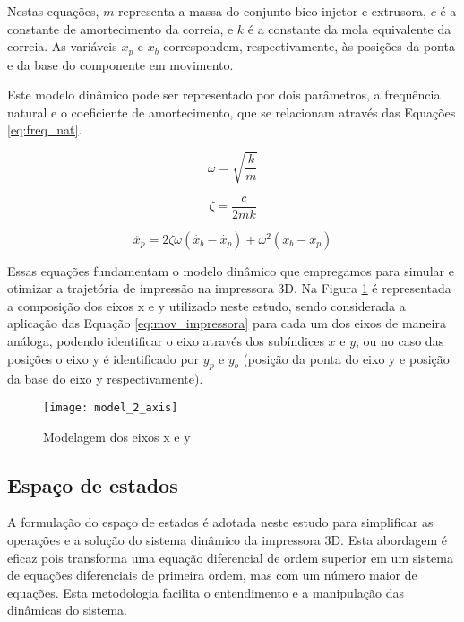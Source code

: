 Nestas equações, \(m\) representa a massa do conjunto bico injetor e extrusora, \(c\) é a constante de amortecimento da correia, e \(k\) é a constante da mola equivalente da correia. As variáveis \(x_p\) e \(x_b\) correspondem, respectivamente, às posições da ponta e da base do componente em movimento. 

Este modelo dinâmico pode ser representado por dois parâmetros, a frequência natural e o coeficiente de amortecimento, que se relacionam através das Equações \ref{eq:freq_nat}.


\begin{equation}
    \label{eq:freq_nat}
    \omega = \sqrt{\frac{k}{m}}
\end{equation}

\begin{equation}
    \label{eq:amort}
    \zeta = \frac{c}{2mk}
\end{equation}

\begin{equation}
    \label{eq:equation_simpl}
    \ddot{x_p} = 2 \zeta \omega(\dot{x_b} - \dot{x_p}) + \omega ^2(x_b - x_p)
\end{equation}

Essas equações fundamentam o modelo dinâmico que empregamos para simular e otimizar a trajetória de impressão na impressora 3D. Na Figura \ref{fig:model_2_axis} é representada a composição dos eixos x e y utilizado neste estudo, sendo considerada a aplicação das Equação \ref{eq:mov_impressora} para cada um dos eixos de maneira análoga, podendo identificar o eixo através dos subíndices \(x\) e \(y\), ou no caso das posições o eixo y é identificado por \(y_p\) e \(y_b\) (posição da ponta do eixo y e posição da base do eixo y respectivamente).

\begin{figure}[H]
    \centering
    \caption{Modelagem dos eixos x e y}
    \texttt{[image: model\_2\_axis]}

    \label{fig:model_2_axis}
\end{figure}

\subsection{Espaço de estados}
A formulação do espaço de estados é adotada neste estudo para simplificar as operações e a solução do sistema dinâmico da impressora 3D. Esta abordagem é eficaz pois transforma uma equação diferencial de ordem superior em um sistema de equações diferenciais de primeira ordem, mas com um número maior de equações. Esta metodologia facilita o entendimento e a manipulação das dinâmicas do sistema.

